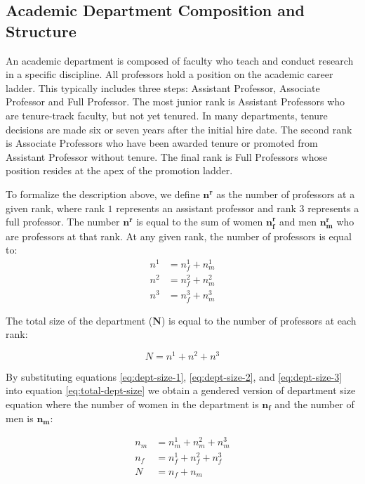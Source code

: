 \documentclass[12pt, a4paper, oneside, headinclude, footinclude,english]{article}
\begin{document}
\subsection{Academic Department Composition and Structure}
\label{sec:dept-structure}

An academic department is composed of faculty who teach
and conduct research in a specific discipline. All professors hold a position on the academic career ladder.  This typically includes three steps:  Assistant Professor, Associate Professor and Full Professor. The most junior rank is Assistant Professors who are tenure-track faculty, but not yet tenured. In many departments, tenure decisions are made six or seven years after the initial hire date. The second rank is Associate Professors who have been awarded tenure or promoted from Assistant Professor without tenure. The final rank is Full Professors whose position resides at the apex of the promotion ladder.

To formalize the description above, we define $\bm{n^r}$ as the number of professors
at a given rank, where rank $1$ represents an assistant professor and rank $3$ represents
a full professor. The number $\bm{n^r}$ is equal to the sum of women $\bm{n_f^r}$  and men $\bm{n_m^r}$ who are professors at that rank. At any given rank, the number of professors is equal to:
\begin{align}
  n^1 & = n^1_f + n^1_m \label{eq:dept-size-1} \\
  n^2 & = n^2_f + n^2_m  \label{eq:dept-size-2} \\
  n^3 & = n^3_f + n^3_m \label{eq:dept-size-3}
\end{align}

The total size of the department ($\bm{N}$) is equal to the number of professors at
each rank:

\begin{equation}
  \label{eq:total-dept-size}
  N = n^1 + n^2 + n^3
\end{equation}

By substituting equations
\ref{eq:dept-size-1}, \ref{eq:dept-size-2}, and \ref{eq:dept-size-3} into equation \ref{eq:total-dept-size} we obtain a gendered version of department size equation where the number of women in the department is $\bm{n_f}$ and the number of men is $\bm{n_m}$:

\begin{align}
  n_m &= n^1_m + n^2_m + n^3_m  \label{eq:female-number} \\
  n_f &= n^1_f + n^2_f + n^3_f  \label{eq:male-number} \\
  N &= n_f + n_m  \label{eq:total-gender-dept-size}
\end{align}
\end{document}
